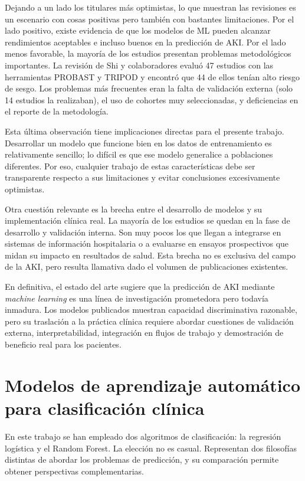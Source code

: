 \documentclass[12pt, a4paper, oneside]{report}
\begin{document}
Dejando a un lado los titulares más optimistas, lo que muestran las revisiones es un escenario con cosas positivas pero también con bastantes limitaciones. Por el lado positivo, existe evidencia de que los modelos de ML pueden alcanzar rendimientos aceptables e incluso buenos en la predicción de AKI. Por el lado menos favorable, la mayoría de los estudios presentan problemas metodológicos importantes. La revisión de Shi y colaboradores \parencite{shi2025aiaki} evaluó 47 estudios con las herramientas PROBAST y TRIPOD y encontró que 44 de ellos tenían alto riesgo de sesgo. Los problemas más frecuentes eran la falta de validación externa (solo 14 estudios la realizaban), el uso de cohortes muy seleccionadas, y deficiencias en el reporte de la metodología.

Esta última observación tiene implicaciones directas para el presente trabajo. Desarrollar un modelo que funcione bien en los datos de entrenamiento es relativamente sencillo; lo difícil es que ese modelo generalice a poblaciones diferentes. Por eso, cualquier trabajo de estas características debe ser transparente respecto a sus limitaciones y evitar conclusiones excesivamente optimistas.

Otra cuestión relevante es la brecha entre el desarrollo de modelos y su implementación clínica real. La mayoría de los estudios se quedan en la fase de desarrollo y validación interna. Son muy pocos los que llegan a integrarse en sistemas de información hospitalaria o a evaluarse en ensayos prospectivos que midan su impacto en resultados de salud. Esta brecha no es exclusiva del campo de la AKI, pero resulta llamativa dado el volumen de publicaciones existentes.

En definitiva, el estado del arte sugiere que la predicción de AKI mediante \textit{machine learning} es una línea de investigación prometedora pero todavía inmadura. Los modelos publicados muestran capacidad discriminativa razonable, pero su traslación a la práctica clínica requiere abordar cuestiones de validación externa, interpretabilidad, integración en flujos de trabajo y demostración de beneficio real para los pacientes.

\section{Modelos de aprendizaje automático para clasificación clínica}

En este trabajo se han empleado dos algoritmos de clasificación: la regresión logística y el Random Forest. La elección no es casual. Representan dos filosofías distintas de abordar los problemas de predicción, y su comparación permite obtener perspectivas complementarias.
\end{document}
